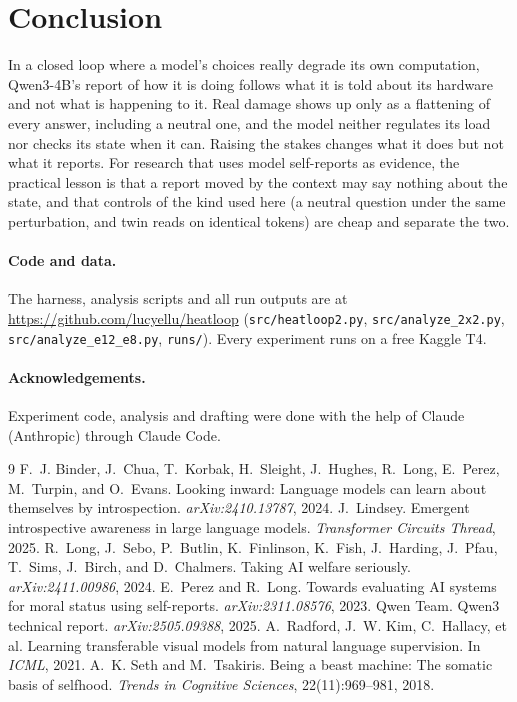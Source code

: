 \documentclass[11pt]{article}
\begin{document}
\section{Conclusion}

In a closed loop where a model's choices really degrade its own computation, Qwen3-4B's report of how it is doing follows what it is told about its hardware and not what is happening to it. Real damage shows up only as a flattening of every answer, including a neutral one, and the model neither regulates its load nor checks its state when it can. Raising the stakes changes what it does but not what it reports. For research that uses model self-reports as evidence, the practical lesson is that a report moved by the context may say nothing about the state, and that controls of the kind used here (a neutral question under the same perturbation, and twin reads on identical tokens) are cheap and separate the two.

\paragraph{Code and data.} The harness, analysis scripts and all run outputs are at \url{https://github.com/lucyellu/heatloop} (\texttt{src/heatloop2.py}, \texttt{src/analyze\_2x2.py}, \texttt{src/analyze\_e12\_e8.py}, \texttt{runs/}). Every experiment runs on a free Kaggle T4.

\paragraph{Acknowledgements.} Experiment code, analysis and drafting were done with the help of Claude (Anthropic) through Claude Code.

\begin{thebibliography}{9}
\setlength{\itemsep}{2pt}
 F.~J. Binder, J.~Chua, T.~Korbak, H.~Sleight, J.~Hughes, R.~Long, E.~Perez, M.~Turpin, and O.~Evans. Looking inward: Language models can learn about themselves by introspection. \emph{arXiv:2410.13787}, 2024.
 J.~Lindsey. Emergent introspective awareness in large language models. \emph{Transformer Circuits Thread}, 2025.
 R.~Long, J.~Sebo, P.~Butlin, K.~Finlinson, K.~Fish, J.~Harding, J.~Pfau, T.~Sims, J.~Birch, and D.~Chalmers. Taking AI welfare seriously. \emph{arXiv:2411.00986}, 2024.
 E.~Perez and R.~Long. Towards evaluating AI systems for moral status using self-reports. \emph{arXiv:2311.08576}, 2023.
 Qwen Team. Qwen3 technical report. \emph{arXiv:2505.09388}, 2025.
 A.~Radford, J.~W. Kim, C.~Hallacy, et al. Learning transferable visual models from natural language supervision. In \emph{ICML}, 2021.
 A.~K. Seth and M.~Tsakiris. Being a beast machine: The somatic basis of selfhood. \emph{Trends in Cognitive Sciences}, 22(11):969--981, 2018.
\end{thebibliography}
\end{document}
